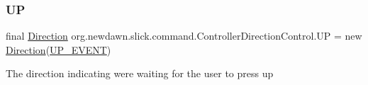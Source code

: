 \subsubsection{\texorpdfstring{UP}{UP}}
{\footnotesize\ttfamily final \mbox{\hyperlink{classorg_1_1newdawn_1_1slick_1_1command_1_1_controller_direction_control_1_1_direction}{Direction}} org.\+newdawn.\+slick.\+command.\+Controller\+Direction\+Control.\+UP = new \mbox{\hyperlink{classorg_1_1newdawn_1_1slick_1_1command_1_1_controller_direction_control_1_1_direction}{Direction}}(\mbox{\hyperlink{classorg_1_1newdawn_1_1slick_1_1command_1_1_controller_control_ae540186bc6a893c019894143082ed376}{U\+P\+\_\+\+E\+V\+E\+NT}})\hspace{0.3cm}{\ttfamily [static]}}

The direction indicating we\textquotesingle{}re waiting for the user to press up 